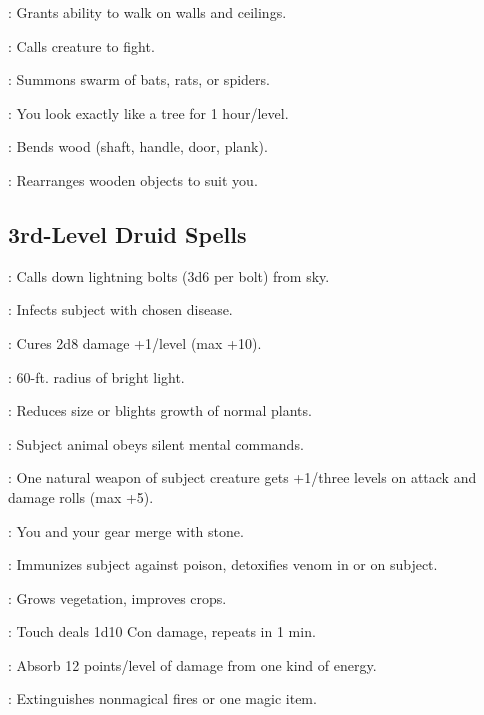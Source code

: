 \begin{multicols}{2}
\begin{description*}
\item[\linkspell{Spider Climb}:] Grants ability to walk on walls and ceilings.
\item[\linkspell{Summon Nature’s Ally II}:] Calls creature to fight.
\item[\linkspell{Summon Swarm}:] Summons swarm of bats, rats, or spiders.
\item[\linkspell{Tree Shape}:] You look exactly like a tree for 1 hour/level.
\item[\linkspell{Warp Wood}:] Bends wood (shaft, handle, door, plank).
\item[\linkspell{Wood Shape}:] Rearranges wooden objects to suit you.
\end{description*}

\subsection{3rd-Level Druid Spells}
\begin{description*}
\item[\linkspell{Call Lightning}:] Calls down lightning bolts (3d6 per bolt) from sky.
\item[\linkspell{Contagion}:] Infects subject with chosen disease.
\item[\linkspell{Cure Moderate Wounds}:] Cures 2d8 damage +1/level (max +10).
\item[\linkspell{Daylight}:] 60-ft. radius of bright light.
\item[\linkspell{Diminish Plants}:] Reduces size or blights growth of normal plants.
\item[\linkspell{Dominate Animal}:] Subject animal obeys silent mental commands.
\item[\linkspell{Magic Fang, Greater}:] One natural weapon of subject creature gets +1/three levels on attack and damage rolls (max +5).
\item[\linkspell{Meld into Stone}:] You and your gear merge with stone.
\item[\linkspell{Neutralize Poison}:] Immunizes subject against poison, detoxifies venom in or on subject.
\item[\linkspell{Plant Growth}:] Grows vegetation, improves crops.
\item[\linkspell{Poison}:] Touch deals 1d10 Con damage, repeats in 1 min.
\item[\linkspell{Protection from Energy}:] Absorb 12 points/level of damage from one kind of energy.
\item[\linkspell{Quench}:] Extinguishes nonmagical fires or one magic item.

\end{description*}
\end{multicols}
